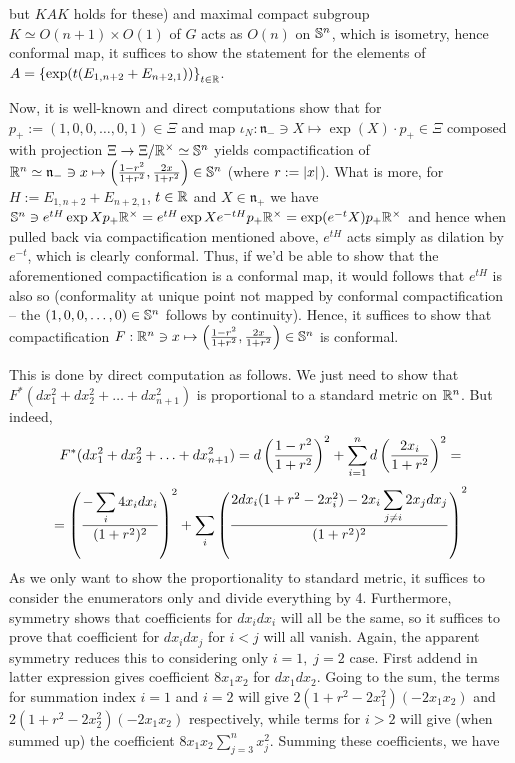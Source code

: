 \documentclass[8pt]{article} %
\begin{document}
but $KAK$ holds for these) and maximal compact subgroup $K\simeq O(n+1)\times O(1)$ of $G$ acts as $O(n)$ on $\mathbb{S}^{n}$, which
is isometry, hence conformal map, it suffices to show the statement for the elements of $A=\left\{\exp(t(E_{ 1,n+2 }+E_{ n+2,1 }))
\right\}_{ t\in\mathbb{R} }$. \par
Now, it is well-known and direct computations show that for $p_+:=(1,0,0,\hdots,0,1)\in\Xi$ and map $\iota_N:\mathfrak{n}_-\ni X
\mapsto\exp(X)\cdot p_+\in\Xi$ composed with projection $\Xi\to\Xi/\mathbb{R}^\times\simeq\mathbb{S}^{ n }$ yields compactification
of $\mathbb{R}^n\simeq\mathfrak{ n }_-\ni x\mapsto \left( \frac{ 1-r^2 }{ 1+r^2 },\frac{ 2x }{ 1+r^2 }\right)\in\mathbb{S}^{ n }$
(where $r:=\left| x \right|$).
What is more, for $H:=E_{ 1,n+2 }+E_{ n+2,1 }$, $t\in\mathbb{R}$ and $X\in\mathfrak{ n }_+$ we have
$\mathbb{S}^{ n }\ni e^{ tH }\exp{ X }p_+\mathbb{R}^\times=e^{ tH }\exp{ X }e^{ -tH }p_+\mathbb{R}^\times=\exp(e^{ -t }X)p_+\mathbb{R}^\times$
and hence when pulled back via compactification mentioned above, $e^{ tH }$ acts simply as dilation by ${ e^{ -t } }$,
which is clearly conformal. Thus, if we'd be able to show that the aforementioned compactification is a conformal map,
it would follows that $e^{ tH }$ is also so
(conformality at unique point not mapped by conformal compactification -- the $(1,0,0,\hdots,0)\in\mathbb{S}^{ n 
}$ follows by continuity). Hence, it suffices to show that compactification 
$F:\mathbb{R}^n\ni x\mapsto \left( \frac{ 1-r^2 }{ 1+r^2 },\frac{ 2x }{ 1+r^2 }\right)\in\mathbb{S}^{ n }$ is conformal.\par
This is done by direct computation as follows. We just need to show that $F^*(dx_1^2+dx_2^2+\hdots+dx_{ n+1 }^2)$ is proportional
to a standard metric on $\mathbb{R}^n$. But indeed,
\[F^*(dx_1^2+dx_2^2+\hdots+dx_{ n+1 }^2)=d\mybra{ \frac{ 1-r^2 }{ 1+r^2 } }^2+\sum_{ i=1 }^{ n }d\mybra{ \frac{ 2x_i }{ 1+r^2 } }^2=\]
\[=\mybra{\frac{ -\sum_i4x_idx_i }{(1+r^2)^2}}^2+\sum_i\mybra{\frac{ 2dx_i(1+r^2-2x_i^2)-2x_i\sum_{ j\neq i }2x_jdx_j }{(1+r^2)^2}}^2
\]
As we only want to show the proportionality to standard metric, it suffices to consider the enumerators only and
divide everything by 4. Furthermore,
symmetry shows that coefficients for $dx_idx_i$ will all be the same, so it suffices to prove that coefficient for $dx_idx_j$
for $i<j$ will all vanish. Again, the apparent symmetry reduces this to considering only $i=1,\;j=2$ case. First addend
in latter expression gives coefficient $8x_1x_2$ for $dx_1dx_2$. Going to the sum, the terms for summation index $i=1$
and $i=2$ will give $2(1+r^2-2x_1^2)(-2x_1x_2)$ and $2(1+r^2-2x_2^2)(-2x_1x_2)$ respectively, while
terms for $i>2$ will give (when summed up) the coefficient $8x_1x_2\sum_{ j=3}^nx_j^2$. Summing these coefficients, we have
\end{document}
